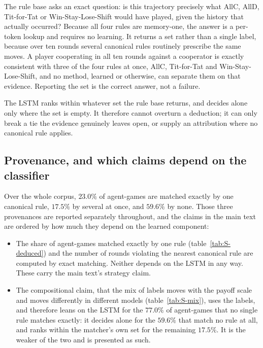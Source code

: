 \documentclass[11pt,a4paper]{article}
\begin{document}
The rule base asks an exact question: is this trajectory precisely what AllC,
AllD, Tit-for-Tat or Win-Stay-Lose-Shift would have played, given the history
that actually occurred? Because all four rules are memory-one, the answer is a
per-token lookup and requires no learning. It returns a set rather than a single
label, because over ten rounds several canonical rules routinely prescribe the
same moves. A player cooperating in all ten rounds against a cooperator is
exactly consistent with three of the four rules at once, AllC, Tit-for-Tat and
Win-Stay-Lose-Shift, and no method, learned or otherwise, can separate them on
that evidence. Reporting the set is the correct answer, not a failure.

The LSTM ranks within whatever set the rule base returns, and decides alone only
where the set is empty. It therefore cannot overturn a deduction; it can only
break a tie the evidence genuinely leaves open, or supply an attribution where
no canonical rule applies.

\subsection{Provenance, and which claims depend on the classifier}

Over the whole corpus, $23.0\%$ of agent-games are matched exactly by one
canonical rule, $17.5\%$ by several at once, and $59.6\%$ by none. Those three
provenances are reported separately throughout, and the claims in the main text
are ordered by how much they depend on the learned component:

\begin{itemize}
\item The share of agent-games matched exactly by one rule
      (table~\ref{tab:S-deduced}) and the number of rounds violating the
      nearest canonical rule are computed by exact matching. Neither depends on
      the LSTM in any way. These carry the main text's strategy claim.
\item The compositional claim, that the mix of labels moves with the payoff
      scale and moves differently in different models
      (table~\ref{tab:S-mix}), uses the labels, and therefore
      leans on the LSTM for the $77.0\%$ of agent-games that no single rule
      matches exactly: it decides alone for the $59.6\%$ that match no rule at
      all, and ranks within the matcher's own set for the remaining $17.5\%$.
      It is the weaker of the two and is presented as such.
\end{itemize}
\end{document}
